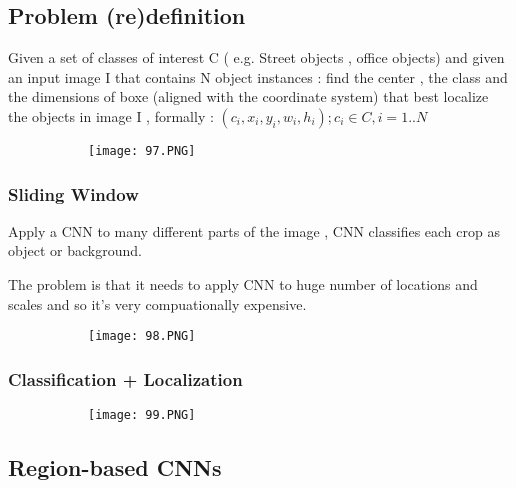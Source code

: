 \documentclass{article}
\begin{document}
\subsection{Problem (re)definition}

Given a set of classes of interest C ( e.g. Street objects , office objects) and given an input image I that contains N object instances : find the center , the class and the dimensions of boxe (aligned with the coordinate system) that best localize the objects in image I , formally : ${(c_i,x_i,y_i,w_i,h_i)}; c_i \in C, i = 1..N$

\begin{figure}[ht!]
  \centering
  \begin{subfigure}[b]{0.8\linewidth}
    \texttt{[image: 97.PNG]}
  \end{subfigure}
\end{figure}

\subsubsection{Sliding Window}

Apply a CNN to many different parts of the image , CNN classifies each crop as object or background.

The problem is that it needs to apply CNN to huge number of locations and scales and so it's very compuationally expensive.

\begin{figure}[ht!]
  \centering
  \begin{subfigure}[b]{0.8\linewidth}
    \texttt{[image: 98.PNG]}
  \end{subfigure}
\end{figure}


\subsubsection{Classification + Localization}

\begin{figure}[ht!]
  \centering
  \begin{subfigure}[b]{0.8\linewidth}
    \texttt{[image: 99.PNG]}
  \end{subfigure}
\end{figure}

\vspace{10mm}

\subsection{Region-based CNNs}
\end{document}
